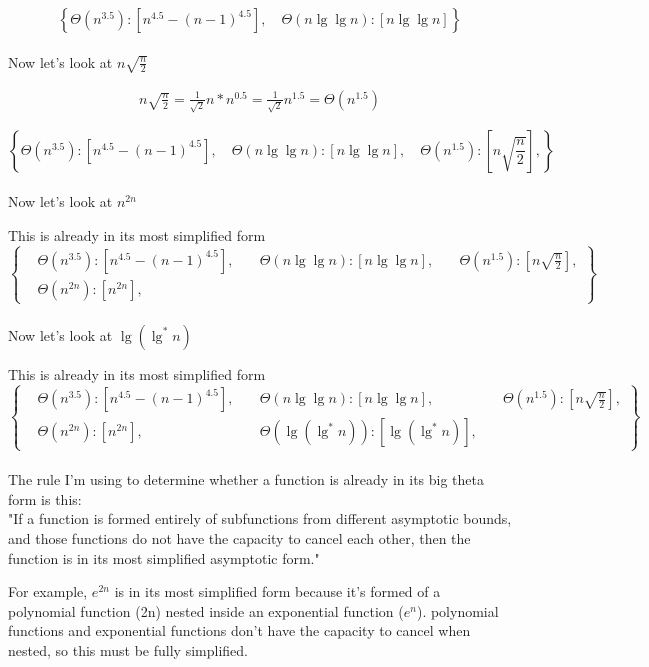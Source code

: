 \documentclass[11pt,fleqn]{article}
\theoremstyle{definition}
\theoremstyle{remark}
\begin{document}
\[
\left\{
\Theta(n^{3.5}): [n^{4.5} - (n - 1)^{4.5}], 
\quad \Theta(n \lg \lg n): [n \lg \lg n]
\right\}
\]\\

Now let's look at $n\sqrt{\frac{n}{2}}$

\begin{align*}
    n\sqrt{\frac{n}{2}} =
    \frac{1}{\sqrt{2}}n*n^{0.5} = 
    \frac{1}{\sqrt{2}}n^{1.5} = 
    \Theta({n^{1.5}})
\end{align*}


\[
\left\{
\Theta(n^{3.5}): [n^{4.5} - (n - 1)^{4.5}], 
\quad \Theta(n \lg \lg n): [n \lg \lg n],
\quad \Theta(n^{1.5}): [n\sqrt{\frac{n}{2}}],
\right\}
\]\\

Now let's look at $n^{2n}$

This is already in its most simplified form\\

\[
\left\{
\begin{aligned}
& \Theta(n^{3.5}): [n^{4.5} - (n - 1)^{4.5}], 
& \quad \Theta(n \lg \lg n): [n \lg \lg n],
& \quad \Theta(n^{1.5}): [n\sqrt{\frac{n}{2}}],\\
& \Theta(n^{2n}): [n^{2n}],
\end{aligned}
\right\}
\]\\

Now let's look at $\lg(\lg^*n)$

This is already in its most simplified form\\

\[
\left\{
\begin{aligned}
& \Theta(n^{3.5}): [n^{4.5} - (n - 1)^{4.5}], 
& \quad \Theta(n \lg \lg n): [n \lg \lg n],
& \quad \Theta(n^{1.5}): [n\sqrt{\frac{n}{2}}],\\
& \Theta(n^{2n}): [n^{2n}],
& \quad \Theta(\lg(\lg^*n)): [\lg(\lg^*n)],
\end{aligned}
\right\}
\]\\

The rule I'm using to 
determine whether a function is already in its big theta form is 
this:\\

"If a function is formed entirely of subfunctions from different 
asymptotic bounds, and those functions do not have the capacity
to cancel each other, then the function is in its most simplified 
asymptotic form."

For example, $e^{2n}$ is in its most simplified form because it's 
formed of a polynomial function (2n) 
nested inside an exponential function ($e^n$).
polynomial functions and exponential functions don't have the capacity
to cancel when nested, so this must be fully simplified.\\ 
\end{document}
